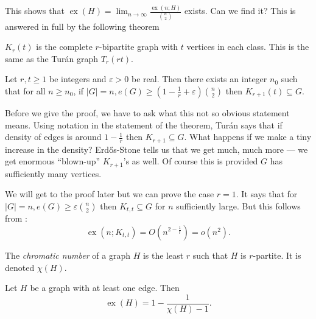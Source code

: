 \documentclass[a4paper]{article}
\DeclareMathOperator{\exx}{ex} %
\begin{document}
This shows that \(\exx(H) = \lim_{n \to \infty} \frac{\exx(n; H)}{\binom{n}{2}}\) exists. Can we find it? This is answered in full by the following theorem

\begin{notation}
  \(K_r(t)\) is the complete \(r\)-bipartite graph with \(t\) vertices in each class. This is the same as the Turán graph \(T_r(rt)\).
\end{notation}

\begin{theorem}
  \label{thm:Erdős-Stone theorem}
  Let \(r, t \geq 1\) be integers and \(\varepsilon > 0\) be real. Then there exists an integer \(n_0\) such that for all \(n \geq n_0\), if \(|G| = n, e(G) \geq (1 - \frac{1}{r} + \varepsilon) \binom{n}{2}\) then \(K_{r + 1}(t) \subseteq G\).
\end{theorem}

Before we give the proof, we have to ask what this not so obvious statement means. Using notation in the statement of the theorem, Turán says that if density of edges is around \(1 - \frac{1}{r}\) then \(K_{r + 1} \subseteq G\). What happens if we make a tiny increase in the density? Erdős-Stone tells us that we get much, much more --- we get enormous ``blown-up'' \(K_{r + 1}\)'s as well. Of course this is provided \(G\) has sufficiently many vertices.

We will get to the proof later but we can prove the case \(r = 1\). It says that for \(|G| = n, e(G) \geq \varepsilon \binom{n}{2}\) then \(K_{t, t} \subseteq G\) for \(n\) sufficiently large. But this follows from :
\[
  \exx(n; K_{t, t}) = O(n^{2 - \frac{1}{t}}) = o(n^2).
\]

\begin{definition}
  The \emph{chromatic number} of a graph \(H\) is the least \(r\) such that \(H\) is \(r\)-partite. It is denoted \(\chi(H)\).
\end{definition}

\begin{corollary}
  \label{cor:forbidden subgraph and chromatic number}
  Let \(H\) be a graph with at least one edge. Then
  \[
    \exx(H) = 1 - \frac{1}{\chi(H) - 1}.
  \]
\end{corollary}
\end{document}

